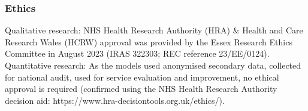 \subsubsection{Ethics}

Qualitative research: NHS Health Research Authority (HRA) \& Health and Care Research Wales (HCRW) approval was provided by the Essex Research Ethics Committee in August 2023 (IRAS 322303; REC reference 23/EE/0124). Quantitative research: As the models used anonymised secondary data, collected for national audit, used for service evaluation and improvement, no ethical approval is required (confirmed using the NHS Health Research Authority decision aid: https://www.hra-decisiontools.org.uk/ethics/).